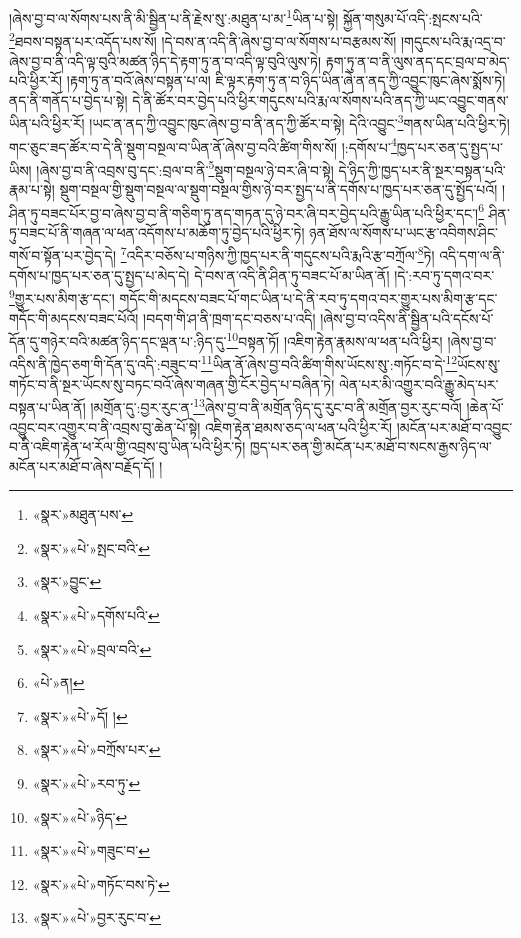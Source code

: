 །ཞེས་བྱ་བ་ལ་སོགས་པས་ནི་མི་སྦྱིན་པ་ནི་རྗེས་སུ་:མཐུན་པ་མ་\footnote{«སྣར་»མཐུན་པས་}ཡིན་པ་སྟེ། སྐྱོན་གསུམ་པོ་འདི་:སྤངས་པའི་\footnote{«སྣར་»«པེ་»སྤང་བའི་}ཐབས་བསྟན་པར་འདོད་པས་སོ། །དེ་བས་ན་འདི་ནི་ཞེས་བྱ་བ་ལ་སོགས་པ་བརྩམས་སོ། །གདུངས་པའི་རྨ་འདྲ་བ་ཞེས་བྱ་བ་ནི་འདི་ལྟ་བུའི་མཚན་ཉིད་དེ་རྟག་ཏུ་ན་བ་འདི་ལྟ་བུའི་ལུས་ཏེ། རྟག་ཏུ་ན་བ་ནི་ལུས་ནད་དང་བྲལ་བ་མེད་པའི་ཕྱིར་རོ། །རྟག་ཏུ་ན་བའོ་ཞེས་བསྟན་པ་ལ། ཇི་ལྟར་རྟག་ཏུ་ན་བ་ཉིད་ཡིན་ཞེ་ན་ནད་ཀྱི་འབྱུང་ཁུང་ཞེས་སྨོས་ཏེ། ནད་ནི་གནོད་པ་བྱེད་པ་སྟེ། དེ་ནི་ཚོར་བར་བྱེད་པའི་ཕྱིར་གདུངས་པའི་རྨ་ལ་སོགས་པའི་ནད་ཀྱི་ཡང་འབྱུང་གནས་ཡིན་པའི་ཕྱིར་རོ། །ཡང་ན་ནད་ཀྱི་འབྱུང་ཁུང་ཞེས་བྱ་བ་ནི་ནད་ཀྱི་ཚོར་བ་སྟེ། དེའི་འབྱུང་\footnote{«སྣར་»བྱུང་}གནས་ཡིན་པའི་ཕྱིར་ཏེ། གང་ཅུང་ཟད་ཚོར་བ་དེ་ནི་སྡུག་བསྔལ་བ་ཡིན་ནོ་ཞེས་བྱ་བའི་ཚིག་གིས་སོ། །:དགོས་པ་\footnote{«སྣར་»«པེ་»དགོས་པའི་}ཁྱད་པར་ཅན་དུ་སྤྱད་པ་ཡིས། །ཞེས་བྱ་བ་ནི་འབྲས་བུ་དང་:བྲལ་བ་ནི་\footnote{«སྣར་»«པེ་»བྲལ་བའི་}སྡུག་བསྔལ་ཉེ་བར་ཞི་བ་སྟེ། དེ་ཉིད་ཀྱི་ཁྱད་པར་ནི་སྔར་བསྟན་པའི་རྣམ་པ་སྟེ། སྡུག་བསྔལ་གྱི་སྡུག་བསྔལ་ལ་སྡུག་བསྔལ་གྱིས་ཉེ་བར་སྤྱད་པ་ནི་དགོས་པ་ཁྱད་པར་ཅན་དུ་སྤྱོད་པའོ། །ཤིན་ཏུ་བཟང་པོར་བྱ་བ་ཞེས་བྱ་བ་ནི་གཅིག་ཏུ་ནད་གཏན་དུ་ཉེ་བར་ཞི་བར་བྱེད་པའི་རྒྱུ་ཡིན་པའི་ཕྱིར་དང་།\footnote{«པེ་»ན།} ཤིན་ཏུ་བཟང་པོ་ནི་གཞན་ལ་ཕན་འདོགས་པ་མཆོག་ཏུ་བྱེད་པའི་ཕྱིར་ཏེ། ཉན་ཐོས་ལ་སོགས་པ་ཡང་རྩ་འབིགས་ཤིང་གསོ་བ་སྟོན་པར་བྱེད་དེ། \footnote{«སྣར་»«པེ་»དོ། ། }འདིར་བཅོས་པ་གཉིས་ཀྱི་ཁྱད་པར་ནི་གདུངས་པའི་རྨའི་རྩ་བཀྲོལ་\footnote{«སྣར་»«པེ་»བཀྲོས་པར་}ཏེ། འདི་དག་ལ་ནི་དགོས་པ་ཁྱད་པར་ཅན་དུ་སྤྱད་པ་མེད་དེ། དེ་བས་ན་འདི་ནི་ཤིན་ཏུ་བཟང་པོ་མ་ཡིན་ནོ། །དེ་:རབ་ཏུ་དགའ་བར་\footnote{«སྣར་»«པེ་»རབ་ཏུ་}གྱུར་པས་མིག་རྩ་དང་། གདོང་གི་མདངས་བཟང་པོ་གང་ཡིན་པ་དེ་ནི་རབ་ཏུ་དགའ་བར་གྱུར་པས་མིག་རྩ་དང་གདོང་གི་མདངས་བཟང་པོའོ། །བདག་གི་ཤ་ནི་ཁྲག་དང་བཅས་པ་འདི། །ཞེས་བྱ་བ་འདིས་ནི་སྦྱིན་པའི་དངོས་པོ་དོན་དུ་གཉེར་བའི་མཚན་ཉིད་དང་ལྡན་པ་:ཉིད་དུ་\footnote{«སྣར་»«པེ་»ཉིད་}བསྟན་ཏོ། །འཇིག་རྟེན་རྣམས་ལ་ཕན་པའི་ཕྱིར། །ཞེས་བྱ་བ་འདིས་ནི་ཁྱེད་ཅག་གི་དོན་དུ་འདི་:བཟུང་བ་\footnote{«སྣར་»«པེ་»གཟུང་བ་}ཡིན་ནོ་ཞེས་བྱ་བའི་ཚིག་གིས་ཡོངས་སུ་:གཏོང་བ་དེ་\footnote{«སྣར་»«པེ་»གཏོང་བས་ཏེ་}ཡོངས་སུ་གཏོང་བ་ནི་སྔར་ཡོངས་སུ་བཏང་བའོ་ཞེས་གཞན་གྱི་ངོར་བྱེད་པ་བཞིན་ཏེ། ལེན་པར་མི་འགྱུར་བའི་རྒྱུ་མེད་པར་བསྟན་པ་ཡིན་ནོ། །མགྲོན་དུ་:བྱར་རུང་ན་\footnote{«སྣར་»«པེ་»བྱར་རུང་བ་}ཞེས་བྱ་བ་ནི་མགྲོན་ཉིད་དུ་རུང་བ་ནི་མགྲོན་བྱར་རུང་བའོ། །ཆེན་པོ་འབྱུང་བར་འགྱུར་བ་ནི་འབྲས་བུ་ཆེན་པོ་སྟེ། འཇིག་རྟེན་ཐམས་ཅད་ལ་ཕན་པའི་ཕྱིར་རོ། །མངོན་པར་མཐོ་བ་འབྱུང་བ་ནི་འཇིག་རྟེན་ཕ་རོལ་གྱི་འབྲས་བུ་ཡིན་པའི་ཕྱིར་ཏེ། ཁྱད་པར་ཅན་གྱི་མངོན་པར་མཐོ་བ་སངས་རྒྱས་ཉིད་ལ་མངོན་པར་མཐོ་བ་ཞེས་བརྗོད་དོ། །
